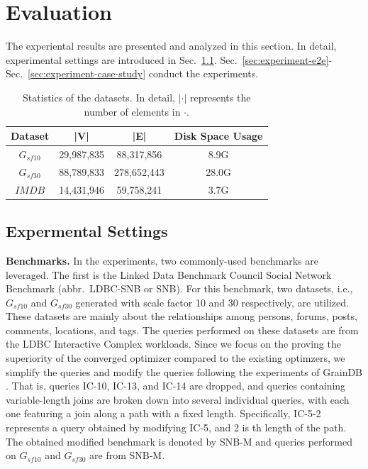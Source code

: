 \section{Evaluation}
The experiental results are presented and analyzed in this section.
In detail, experimental settings are introduced in Sec.~\ref{sec:experiment-settings}.
Sec.~\ref{sec:experiment-e2e}-Sec.~\ref{sec:experiment-case-study} conduct the experiments.

\begin{table}[h]
    \centering
    \begin{tabular}{c|c|c|c}
    \hline
    Dataset & |V| & |E| & Disk Space Usage\\ 
    \hline
    $G_{sf10}$& 29,987,835 & 88,317,856 & 8.9G \\
    \hline
    $G_{sf30}$ & 88,789,833 & 278,652,443 & 28.0G\\
    \hline
    $IMDB$ & 14,431,946 & 59,758,241 & 3.7G \\
    \hline
    \end{tabular}
    \caption{Statistics of the datasets. In detail, $|\cdot|$ represents the number of elements in $\cdot$.}
    \label{table:experiment-datasets}
\end{table}

\subsection{Expermental Settings}
\label{sec:experiment-settings}

\textbf{Benchmarks.} In the experiments, two commonly-used benchmarks are leveraged.
The first is the Linked Data Benchmark Council Social Network Benchmark (abbr.~LDBC-SNB or SNB).
For this benchmark, two datasets, i.e., $G_{sf10}$ and $G_{sf30}$ generated with scale factor 10 and 30 respectively, are utilized.
These datasets are mainly about the relationships among persons, forums, posts, comments, locations, and tags.
The queries performed on these datasets are from the LDBC Interactive Complex workloads.
Since we focus on the proving the superiority of the converged optimizer compared to the existing optimzers, we simplify the queries and modify the queries following the experiments of GrainDB \cite{graindb}.
That is, queries IC-10, IC-13, and IC-14 are dropped, and queries containing variable-length joins are broken down into several individual queries, with each one featuring a join along a path with a fixed length.
Specifically, IC-5-2 represents a query obtained by modifying IC-5, and 2 is th length of the path.
The obtained modified benchmark is denoted by SNB-M and queries performed on $G_{sf10}$ and $G_{sf30}$ are from SNB-M.

